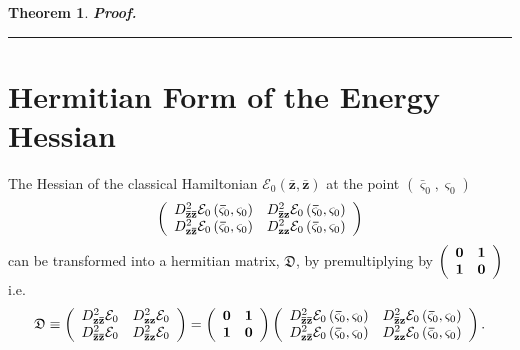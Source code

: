 \documentclass[aps,preprint]{revtex4}%
\newtheorem{theorem}{Theorem}
\newenvironment{proof}[1][Proof]{\noindent\textbf{#1.} }{\ \rule{0.5em}{0.5em}}
\begin{document}
\begin{theorem}
\begin{proof}
\end{proof}
\end{theorem}

\section{Hermitian Form of the Energy Hessian\label{EnergyHess}}

The Hessian of the classical Hamiltonian $\mathcal{E}_{0}\left(
\mathbf{\bar{z}},\mathbf{\bar{z}}\right)  $ at the point $\left(
\mathbf{\bar{\varsigma}}_{0},\mathbf{\varsigma}_{0}\right)  $
\begin{equation}
\left(
\begin{array}
[c]{cc}%
D_{\mathbf{\bar{z}\bar{z}}}^{2}\mathcal{E}_{0}\left(  \mathbf{\bar{\varsigma}%
}_{0},\mathbf{\varsigma}_{0}\right)  & D_{\mathbf{\bar{z}z}}^{2}%
\mathcal{E}_{0}\left(  \mathbf{\bar{\varsigma}}_{0},\mathbf{\varsigma}%
_{0}\right) \\
D_{\mathbf{z\bar{z}}}^{2}\mathcal{E}_{0}\left(  \mathbf{\bar{\varsigma}}%
_{0},\mathbf{\varsigma}_{0}\right)  & D_{\mathbf{zz}}^{2}\mathcal{E}%
_{0}\left(  \mathbf{\bar{\varsigma}}_{0},\mathbf{\varsigma}_{0}\right)
\end{array}
\right)
\end{equation}
can be transformed into a hermitian matrix, $\mathfrak{D}$, by premultiplying
by $\left(
\begin{array}
[c]{cc}%
\mathbf{0} & \mathbf{1}\\
\mathbf{1} & \mathbf{0}%
\end{array}
\right)  $ i.e.
\begin{equation}
\mathfrak{D}\equiv\left(
\begin{array}
[c]{cc}%
D_{\mathbf{z\bar{z}}}^{2}\mathcal{E}_{0} & D_{\mathbf{zz}}^{2}\mathcal{E}%
_{0}\\
D_{\mathbf{\bar{z}\bar{z}}}^{2}\mathcal{E}_{0} & D_{\mathbf{\bar{z}z}}%
^{2}\mathcal{E}_{0}%
\end{array}
\right)  =\left(
\begin{array}
[c]{cc}%
\mathbf{0} & \mathbf{1}\\
\mathbf{1} & \mathbf{0}%
\end{array}
\right)  \left(
\begin{array}
[c]{cc}%
D_{\mathbf{\bar{z}\bar{z}}}^{2}\mathcal{E}_{0}\left(  \mathbf{\bar{\varsigma}%
}_{0},\mathbf{\varsigma}_{0}\right)  & D_{\mathbf{\bar{z}z}}^{2}%
\mathcal{E}_{0}\left(  \mathbf{\bar{\varsigma}}_{0},\mathbf{\varsigma}%
_{0}\right) \\
D_{\mathbf{z\bar{z}}}^{2}\mathcal{E}_{0}\left(  \mathbf{\bar{\varsigma}}%
_{0},\mathbf{\varsigma}_{0}\right)  & D_{\mathbf{zz}}^{2}\mathcal{E}%
_{0}\left(  \mathbf{\bar{\varsigma}}_{0},\mathbf{\varsigma}_{0}\right)
\end{array}
\right)  .
\end{equation}
\end{document}
